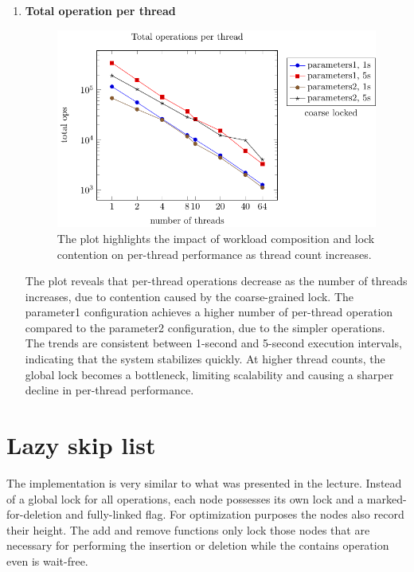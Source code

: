 \documentclass{article}
\begin{document}
\begin{enumerate}
    \item \textbf{Total operation per thread}
    \begin{figure}[H]
        \centering
        \includegraphics{../plots/coarse_per_thread.pdf}
        \caption{The plot highlights the impact of workload composition and lock contention on per-thread performance as thread count increases.}
        \label{fig:coarse_ops_per_thread}
    \end{figure}
   The plot reveals that per-thread operations decrease as the number of threads increases, due to contention caused by the coarse-grained lock. The parameter1 configuration achieves a higher number of per-thread operation compared to the parameter2 configuration, due to the simpler operations. The trends are consistent between 1-second and 5-second execution intervals, indicating that the system stabilizes quickly. At higher thread counts, the global lock becomes a bottleneck, limiting scalability and causing a sharper decline in per-thread performance.

    
\end{enumerate}

\newpage

\section{Lazy skip list}

The implementation is very similar to what was presented in the lecture.
Instead of a global lock for all operations, each node possesses its own lock and a marked-for-deletion and fully-linked flag. For optimization purposes the nodes also record their height.
The add and remove functions only lock those nodes that are necessary for performing the insertion or deletion while the contains operation even is wait-free.
\end{document}
